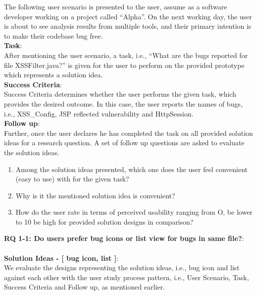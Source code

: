 The following user scenario is presented to the user, assume as a software developer working on a project called “Alpha”. On the next working day, the user is about to see analysis results from multiple tools, and their primary intention is to make their codebase bug free. \\

\textbf{Task}: \\

After mentioning the user scenario, a task, i.e., “What are the bugs reported for file XSSFilter.java?” is given for the user to perform on the provided prototype which represents a solution idea. \\

\textbf{Success Criteria}: \\

Success Criteria determines whether the user performs the given task, which provides the desired outcome. In this case, the user reports the names of bugs, i.e., XSS\_Config, JSP reflected vulnerability and HttpSession. \\

\textbf{Follow up}: \\

Further, once the user declares he has completed the task on all provided solution ideas for a research question. A set of follow up questions are asked to evaluate the solution ideas. \\

\begin{enumerate}
\item Among the solution ideas presented, which one does the user feel convenient (easy to use) with for the given task?
\item Why is it the mentioned solution idea is convenient?
\item How do the user rate in terms of perceived usability ranging from O, be lower to 10 be high for provided solution designs in comparison?
\end{enumerate}

\textbf{RQ 1-1: Do users prefer bug icons or list view for bugs in same file?}: \\ \\

\textbf{Solution Ideas - [ bug icon, list ]}: \\

We evaluate the designs representing the solution ideas, i.e., bug icon and list against each other with the user study process pattern, i.e., User Scenario, Task, Success Criteria and Follow up, as mentioned earlier. \\

